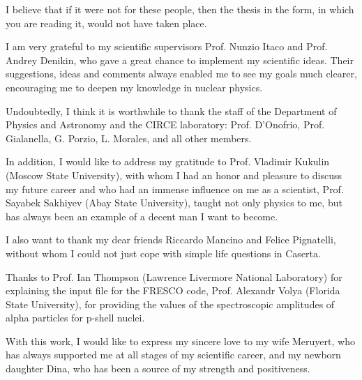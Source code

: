 \documentclass[
12pt, %
oneside, %
english, %
doublespacing, %
doublespacing, %
toctotoc, %
parskip, %
headsepline, %
]{MastersDoctoralThesis} %
\begin{document}
\begin{acknowledgements}
\addchaptertocentry{\acknowledgementname} %
I believe that if it were not for these people, then the thesis in the form, in which you are reading it, would not have taken place.

I am very grateful to my scientific supervisors Prof. Nunzio Itaco and Prof. Andrey Denikin, who gave a great chance to implement my scientific ideas. Their suggestions, ideas and comments always enabled me to see my goals much clearer, encouraging me to deepen my knowledge in nuclear physics.

Undoubtedly, I think it is worthwhile to thank the staff of the Department of Physics and Astronomy and the CIRCE laboratory: Prof. D'Onofrio, Prof. Gialanella, G. Porzio, L. Morales, and all other members.

In addition, I would like to address my gratitude to Prof. Vladimir Kukulin (Moscow State University), with whom I had an honor and pleasure to discuss my future career and who had an immense influence on me as a scientist, Prof. Sayabek Sakhiyev (Abay State University), taught not only physics to me, but has always been an example of a decent man I want to become.

I also want to thank my dear friends Riccardo Mancino and Felice Pignatelli, without whom I could not just cope with simple life questions in Caserta.

Thanks to Prof. Ian Thompson (Lawrence Livermore National Laboratory) for explaining the input file for the FRESCO code, Prof. Alexandr Volya (Florida State University), for providing the values of the spectroscopic amplitudes of alpha particles for p-shell nuclei.

With this work, I would like to express my sincere love to my wife Meruyert, who has always supported me at all stages of my scientific career, and my newborn daughter Dina, who has been a source of my strength and positiveness.
\end{acknowledgements}


\tableofcontents %

\listoffigures %

\listoftables %
\end{document}
